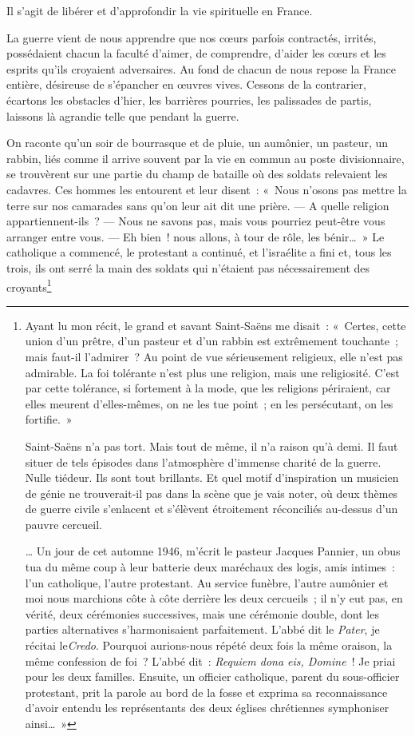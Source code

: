 \documentclass[french,twoside]{book} %
\begin{document}
Il s’agit de libérer et d’approfondir la vie spirituelle en France.‌\par
La guerre vient de nous apprendre que nos cœurs parfois contractés, irrités, possédaient chacun la faculté d’aimer, de comprendre, d’aider les cœurs et les esprits qu’ils croyaient adversaires. Au fond de chacun de nous repose la France entière, désireuse de s’épancher en œuvres vives. Cessons de la contrarier, écartons les obstacles d’hier, les barrières pourries, les palissades de partis, laissons là agrandie telle que pendant la guerre.‌\par
On raconte qu’un soir de bourrasque et de pluie, un aumônier, un pasteur, un rabbin, liés comme il arrive souvent par la vie en commun au poste divisionnaire, se trouvèrent sur une partie du champ de bataille où des soldats relevaient les cadavres. Ces hommes les entourent et leur disent : « Nous n’osons pas mettre la terre sur nos camarades sans qu’on leur ait dit une prière. — A quelle religion appartiennent-ils ? — Nous ne savons pas, mais vous pourriez peut-être vous arranger entre vous. — Eh bien ! nous allons, à tour de rôle, les bénir… » Le catholique a commencé, le protestant a continué, et l’israélite a fini et, tous les trois, ils ont serré la main des soldats qui n’étaient pas nécessairement des croyants\footnote{\noindent Ayant lu mon récit, le grand et savant Saint-Saëns me disait : « Certes, cette union d’un prêtre, d’un pasteur et d’un rabbin est extrêmement touchante ; mais faut-il l’admirer ? Au point de vue sérieusement religieux, elle n’est pas admirable. La foi tolérante n’est plus une religion, mais une religiosité. C’est par cette tolérance, si fortement à la mode, que les religions périraient, car elles meurent d’elles-mêmes, on ne les tue point ; en les persécutant, on les fortifie. »‌\par
 Saint-Saëns n’a pas tort. Mais tout de même, il n’a raison qu’à demi. Il faut situer de tels épisodes dans l’atmosphère d’immense charité de la guerre. Nulle tiédeur. Ils sont tout brillants. Et quel motif d’inspiration un musicien de génie ne trouverait-il pas dans la scène que je vais noter, où deux thèmes de guerre civile s’enlacent et s’élèvent étroitement réconciliés au-dessus d’un pauvre cercueil.‌\par
  \noindent … Un jour de cet automne 1946, m’écrit le pasteur Jacques Pannier, un obus tua du même coup à leur batterie deux maréchaux des logis, amis intimes : l’un catholique, l’autre protestant. Au service funèbre, l’autre aumônier et moi nous marchions côte à côte derrière les deux cercueils ; il n’y eut pas, en vérité, deux cérémonies successives, mais une cérémonie double, dont les parties alternatives s’harmonisaient parfaitement. L’abbé dit le {\itshape Pater}, je récitai le{\itshape Credo}. Pourquoi aurions-nous répété deux fois la même oraison, la même confession de foi ? L’abbé dit : {\itshape Requiem dona eis, Domine} ! Je priai pour les deux familles. Ensuite, un officier catholique, parent du sous-officier protestant, prit la parole au bord de la fosse et exprima sa reconnaissance d’avoir entendu les représentants des deux églises chrétiennes symphoniser ainsi… »‌
}
\end{document}
